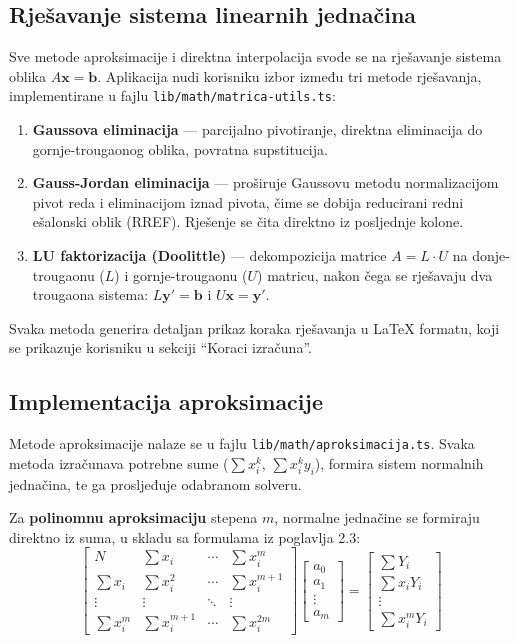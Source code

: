 \documentclass[12pt, a4paper]{article}
\begin{document}
\subsection{Rješavanje sistema linearnih jednačina}

Sve metode aproksimacije i direktna interpolacija svode se na
rješavanje sistema oblika $A\mathbf{x} = \mathbf{b}$. Aplikacija
nudi korisniku izbor između tri metode rješavanja, implementirane
u fajlu \texttt{lib/math/matrica-utils.ts}:

\begin{enumerate}
    \item \textbf{Gaussova eliminacija} --- parcijalno pivotiranje,
    direktna eliminacija do gornje-trougaonog oblika, povratna supstitucija.
    \item \textbf{Gauss-Jordan eliminacija} --- proširuje Gaussovu metodu
    normalizacijom pivot reda i eliminacijom iznad pivota, čime se dobija
    reducirani redni ešalonski oblik (RREF). Rješenje se čita direktno
    iz posljednje kolone.
    \item \textbf{LU faktorizacija (Doolittle)} --- dekompozicija matrice
    $A = L \cdot U$ na donje-trougaonu ($L$) i gornje-trougaonu ($U$)
    matricu, nakon čega se rješavaju dva trougaona sistema:
    $L\mathbf{y'} = \mathbf{b}$ i $U\mathbf{x} = \mathbf{y'}$.
\end{enumerate}

Svaka metoda generira detaljan prikaz koraka rješavanja u LaTeX formatu,
koji se prikazuje korisniku u sekciji ``Koraci izračuna''.

\subsection{Implementacija aproksimacije}

Metode aproksimacije nalaze se u fajlu \texttt{lib/math/aproksimacija.ts}.
Svaka metoda izračunava potrebne sume ($\sum x_i^k$, $\sum x_i^k y_i$),
formira sistem normalnih jednačina, te ga prosljeđuje odabranom solveru.

Za \textbf{polinomnu aproksimaciju} stepena $m$, normalne jednačine se
formiraju direktno iz suma, u skladu sa formulama iz poglavlja 2.3:
\[
    \begin{bmatrix}
    N & \sum x_i & \cdots & \sum x_i^m \\
    \sum x_i & \sum x_i^2 & \cdots & \sum x_i^{m+1} \\
    \vdots & \vdots & \ddots & \vdots \\
    \sum x_i^m & \sum x_i^{m+1} & \cdots & \sum x_i^{2m}
    \end{bmatrix}
    \begin{bmatrix} a_0 \\ a_1 \\ \vdots \\ a_m \end{bmatrix}
    =
    \begin{bmatrix}
    \sum Y_i \\ \sum x_i Y_i \\ \vdots \\ \sum x_i^m Y_i
    \end{bmatrix}
\]
\end{document}
